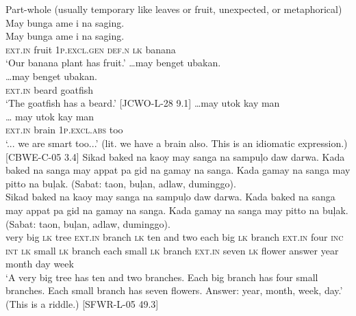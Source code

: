\ea
\label{ex:part-whole-1}
Part-whole (usually temporary like leaves or fruit, unexpected, or metaphorical) \\
May  bunga  ame  i  na  saging. \\\smallskip \gll May  bunga  ame  i  na  saging. \\
\textsc{ext.in}   fruit  1\textsc{p.excl.gen}  \textsc{def.n}  \textsc{lk}  banana \\
\glt ‘Our banana plant has fruit.’
\z
\ea
…may  benget  ubakan. \\\smallskip \gll …may  benget  ubakan. \\
\textsc{ext.in}  beard  goatfish \\
\glt ‘The goatfish has a beard.’ [JCWO-L-28 9.1]
\z
\ea
…may  utok  kay  man \\\smallskip \gll … may  utok  kay  man \\
{} \textsc{ext.in}   brain  1\textsc{p.excl.abs}  too \\
\glt ‘... we are smart too...’ (lit. we have a brain also. This is an idiomatic expression.) [CBWE-C-05 3.4]
\z
\ea
\label{ex:part-whole-2}
Sikad  baked  na  kaoy  may  sanga  na  sampuļo  daw  darwa. Kada  baked  na  sanga  may  appat  pa  gid  na  gamay  na  sanga. Kada  gamay  na  sanga  may  pitto  na  buļak. (Sabat:  taon,  buļan,  adlaw,  duminggo). \\\smallskip \gll Sikad  baked  na  kaoy  may  sanga  na  sampuļo  daw  darwa. Kada  baked  na  sanga  may  appat  pa  gid  na  gamay  na  sanga. Kada  gamay  na  sanga  may  pitto  na  buļak. (Sabat:  taon,  buļan,  adlaw,  duminggo). \\
very  big  \textsc{lk}  tree  \textsc{ext.in}  branch  \textsc{lk}  ten  and  two each  big  \textsc{lk}  branch  \textsc{ext.in}  four  \textsc{inc}  \textsc{int}  \textsc{lk}  small  \textsc{lk}  branch
each  small  \textsc{lk}  branch  \textsc{ext.in}  seven  \textsc{lk} flower
answer  year  month  day  week \\
\glt ‘A very big tree has ten and two branches. Each big branch has four small branches. Each small branch has seven flowers. Answer: year, month, week, day.’  (This is a riddle.) [SFWR-L-05 49.3]
\z
 
